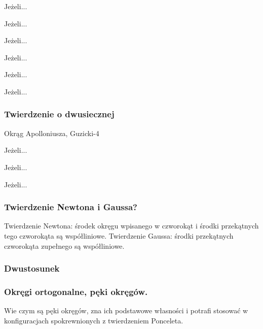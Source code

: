 \begin{proposition}
	Jeżeli...
\end{proposition}
\begin{definition}
	Jeżeli...
\end{definition}
\begin{proposition}
	Jeżeli...
\end{proposition}
\begin{definition}[oś potęgowa]
	Jeżeli...
\end{definition}
\begin{theorem}[Monge'a]
	Jeżeli...
\end{theorem}
\begin{theorem}[Auberta]
	Jeżeli...
\end{theorem}


\subsubsection{Twierdzenie o dwusiecznej}
Okrąg Apolloniusza, Guzicki-4

\begin{proposition}
	Jeżeli...
\end{proposition}
\begin{theorem}
	Jeżeli...
\end{theorem}
\begin{definition}
	Jeżeli...
\end{definition}


\subsubsection{Twierdzenie Newtona i Gaussa?}
Twierdzenie Newtona: środek okręgu wpisanego w czworokąt i środki przekątnych tego czworokąta są współliniowe.
Twierdzenie Gaussa: środki przekątnych czworokąta zupełnego są współliniowe.

\subsubsection{Dwustosunek}

\subsubsection{Okręgi ortogonalne, pęki okręgów.}
Wie czym są pęki okręgów, zna ich podstawowe własności i potrafi stosować w konfiguracjach spokrewnionych z twierdzeniem Ponceleta.   

